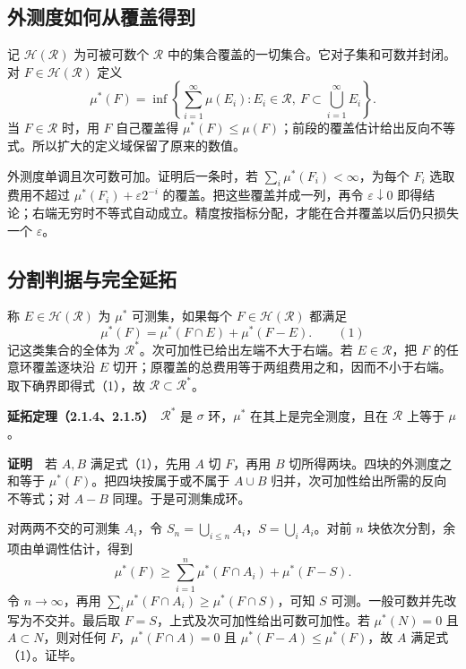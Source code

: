 \documentclass[11pt,a4paper]{article}
\begin{document}
\subsection*{外测度如何从覆盖得到}\label{ux5916ux6d4bux5ea6ux5982ux4f55ux4eceux8986ux76d6ux5f97ux5230}

记 \(\mathcal H(\mathcal R)\) 为可被可数个 \(\mathcal R\) 中的集合覆盖的一切集合。它对子集和可数并封闭。对 \(F\in\mathcal H(\mathcal R)\) 定义 \[
\mu^*(F)=\inf\left\{\sum_{i=1}^{\infty}\mu(E_i):
  E_i\in\mathcal R,\ F\subset\bigcup_{i=1}^{\infty}E_i\right\}.
\] 当 \(F\in\mathcal R\) 时，用 \(F\) 自己覆盖得 \(\mu^*(F)\leq\mu(F)\)；前段的覆盖估计给出反向不等式。所以扩大的定义域保留了原来的数值。

外测度单调且次可数可加。证明后一条时，若 \(\sum_i\mu^*(F_i)<\infty\)，为每个 \(F_i\) 选取费用不超过 \(\mu^*(F_i)+\varepsilon 2^{-i}\) 的覆盖。把这些覆盖并成一列，再令 \(\varepsilon\downarrow0\) 即得结论；右端无穷时不等式自动成立。精度按指标分配，才能在合并覆盖以后仍只损失一个 \(\varepsilon\)。

\subsection*{分割判据与完全延拓}\label{ux5206ux5272ux5224ux636eux4e0eux5b8cux5168ux5ef6ux62d3}

称 \(E\in\mathcal H(\mathcal R)\) 为 \(\mu^*\) 可测集，如果每个 \(F\in\mathcal H(\mathcal R)\) 都满足 \[
\mu^*(F)=\mu^*(F\cap E)+\mu^*(F-E). \qquad (1)
\] 记这类集合的全体为 \(\mathcal R^*\)。次可加性已给出左端不大于右端。若 \(E\in\mathcal R\)，把 \(F\) 的任意环覆盖逐块沿 \(E\) 切开；原覆盖的总费用等于两组费用之和，因而不小于右端。取下确界即得式（1），故 \(\mathcal R\subset\mathcal R^*\)。

\textbf{延拓定理（2.1.4、2.1.5）}　\(\mathcal R^*\) 是 \(\sigma\) 环，\(\mu^*\) 在其上是完全测度，且在 \(\mathcal R\) 上等于 \(\mu\)。

\textbf{证明}　若 \(A,B\) 满足式（1），先用 \(A\) 切 \(F\)，再用 \(B\) 切所得两块。四块的外测度之和等于 \(\mu^*(F)\)。把四块按属于或不属于 \(A\cup B\) 归并，次可加性给出所需的反向不等式；对 \(A-B\) 同理。于是可测集成环。

对两两不交的可测集 \(A_i\)，令 \(S_n=\bigcup_{i\le n}A_i\)，\(S=\bigcup_i A_i\)。对前 \(n\) 块依次分割，余项由单调性估计，得到 \[
\mu^*(F)\geq\sum_{i=1}^n\mu^*(F\cap A_i)+\mu^*(F-S).
\] 令 \(n\to\infty\)，再用 \(\sum_i\mu^*(F\cap A_i)\geq\mu^*(F\cap S)\)，可知 \(S\) 可测。一般可数并先改写为不交并。最后取 \(F=S\)，上式及次可加性给出可数可加性。若 \(\mu^*(N)=0\) 且 \(A\subset N\)，则对任何 \(F\)，\(\mu^*(F\cap A)=0\) 且 \(\mu^*(F-A)\leq\mu^*(F)\)，故 \(A\) 满足式（1）。证毕。
\end{document}
